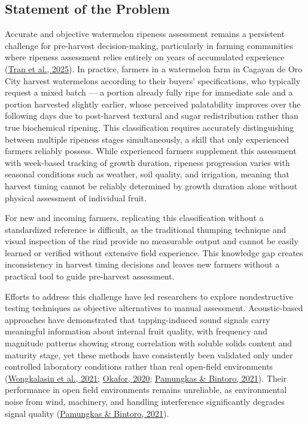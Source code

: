 \begin{thesisprose}
\section{Statement of the Problem}

Accurate and objective watermelon ripeness assessment remains a persistent challenge for pre-harvest decision-making, particularly in farming communities where ripeness assessment relies entirely on years of accumulated experience (\hyperlink{cite.tran2025}{Tran et al., 2025}). In practice, farmers in a watermelon farm in Cagayan de Oro City harvest watermelons according to their buyers' specifications, who typically request a mixed batch — a portion already fully ripe for immediate sale and a portion harvested slightly earlier, whose perceived palatability improves over the following days due to post-harvest textural and sugar redistribution rather than true biochemical ripening. This classification requires accurately distinguishing between multiple ripeness stages simultaneously, a skill that only experienced farmers reliably possess. While experienced farmers supplement this assessment with week-based tracking of growth duration, ripeness progression varies with seasonal conditions such as weather, soil quality, and irrigation, meaning that harvest timing cannot be reliably determined by growth duration alone without physical assessment of individual fruit.

For new and incoming farmers, replicating this classification without a standardized reference is difficult, as the traditional thumping technique and visual inspection of the rind provide no measurable output and cannot be easily learned or verified without extensive field experience. This knowledge gap creates inconsistency in harvest timing decisions and leaves new farmers without a practical tool to guide pre-harvest assessment.

Efforts to address this challenge have led researchers to explore nondestructive testing techniques as objective alternatives to manual assessment. Acoustic-based approaches have demonstrated that tapping-induced sound signals carry meaningful information about internal fruit quality, with frequency and magnitude patterns showing strong correlation with soluble solids content and maturity stage, yet these methods have consistently been validated only under controlled laboratory conditions rather than real open-field environments (\hyperlink{cite.wongkalasin2021}{Wongkalasin et al., 2021}; \hyperlink{cite.okafor2020}{Okafor, 2020}; \hyperlink{cite.pamungkas2021}{Pamungkas \& Bintoro, 2021}). Their performance in open field environments remains unreliable, as environmental noise from wind, machinery, and handling interference significantly degrades signal quality (\hyperlink{cite.pamungkas2021}{Pamungkas \& Bintoro, 2021}).


\end{thesisprose}
